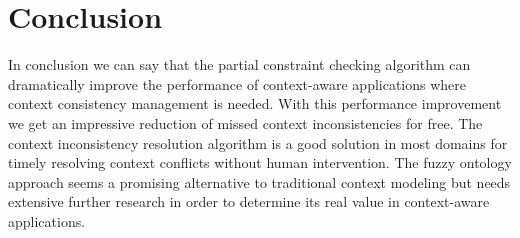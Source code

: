 \documentclass[journal]{vgtc}                %
\begin{document}
\section{Conclusion}
In conclusion we can say that the partial constraint checking algorithm can dramatically improve the performance of context-aware applications where context consistency management is needed. With this performance improvement we get an impressive reduction of missed context inconsistencies for free. The context inconsistency resolution algorithm is a good solution in most domains for timely resolving context conflicts without human intervention. The fuzzy ontology approach seems a promising alternative to traditional context modeling but needs extensive further research in order to determine its real value in context-aware applications.



\end{document}
